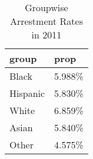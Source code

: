 \begin{table}[ht]
\centering
\begin{tabular}{ll}
  \hline
group & prop \\ 
  \hline
Black & 5.988\% \\ 
  Hispanic & 5.830\% \\ 
  White & 6.859\% \\ 
  Asian & 5.840\% \\ 
  Other & 4.575\% \\ 
   \hline
\end{tabular}
\caption{Groupwise Arrestment Rates in 2011} 
\label{tab:groupwise_arrestment_rates_2011}
\end{table}

